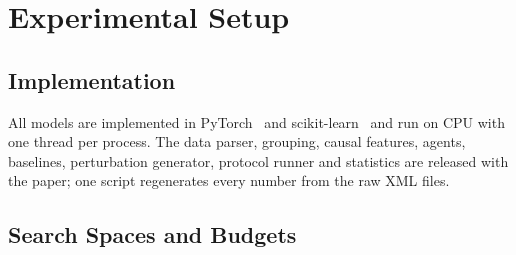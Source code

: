\section{Experimental Setup}
\label{sec:setup}

\subsection{Implementation}
All models are implemented in PyTorch~\cite{paszke2019pytorch} and scikit-learn~\cite{pedregosa2011sklearn} and run on CPU with one thread per process. The data parser, grouping, causal features, agents, baselines, perturbation generator, protocol runner and statistics are released with the paper; one script regenerates every number from the raw XML files.

\subsection{Search Spaces and Budgets}
